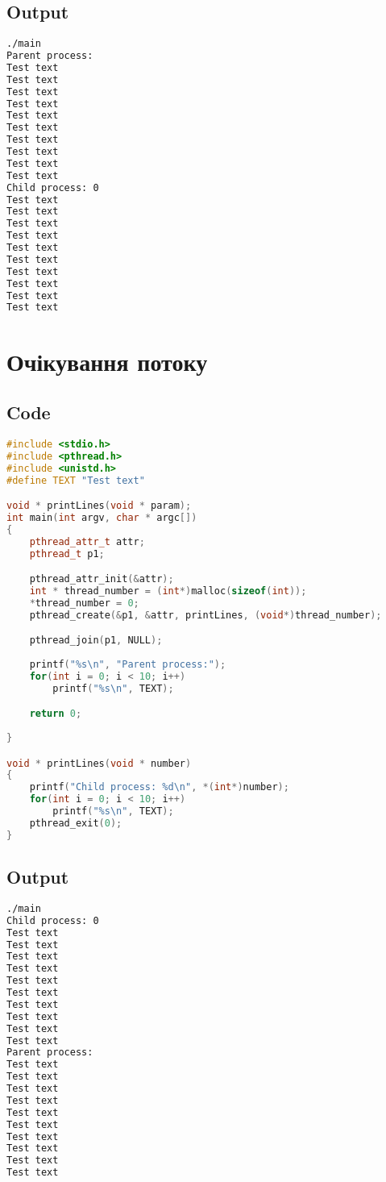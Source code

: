 \documentclass{article}
\begin{document}
\subsection{Output}\vspace{-3mm}
\begin{lstlisting}[language=BASH]
./main 
Parent process:
Test text
Test text
Test text
Test text
Test text
Test text
Test text
Test text
Test text
Test text
Child process: 0
Test text
Test text
Test text
Test text
Test text
Test text
Test text
Test text
Test text
Test text

\end{lstlisting}
\newpage
\section{Очікування потоку}
\subsection{Code}\vspace{-3mm}
\begin{lstlisting}[language=C++]
#include <stdio.h>
#include <pthread.h>
#include <unistd.h>
#define TEXT "Test text"

void * printLines(void * param);
int main(int argv, char * argc[])
{
    pthread_attr_t attr;
    pthread_t p1;

    pthread_attr_init(&attr);
    int * thread_number = (int*)malloc(sizeof(int));
    *thread_number = 0;
    pthread_create(&p1, &attr, printLines, (void*)thread_number);

    pthread_join(p1, NULL);
    
    printf("%s\n", "Parent process:");
    for(int i = 0; i < 10; i++)
        printf("%s\n", TEXT);

    return 0;
    
}

void * printLines(void * number)
{
    printf("Child process: %d\n", *(int*)number);
    for(int i = 0; i < 10; i++)
        printf("%s\n", TEXT);
    pthread_exit(0);
}
\end{lstlisting}

\subsection{Output}\vspace{-3mm}

\begin{lstlisting}[language=BASH]
./main 
Child process: 0
Test text
Test text
Test text
Test text
Test text
Test text
Test text
Test text
Test text
Test text
Parent process:
Test text
Test text
Test text
Test text
Test text
Test text
Test text
Test text
Test text
Test text
\end{lstlisting}
\end{document}
